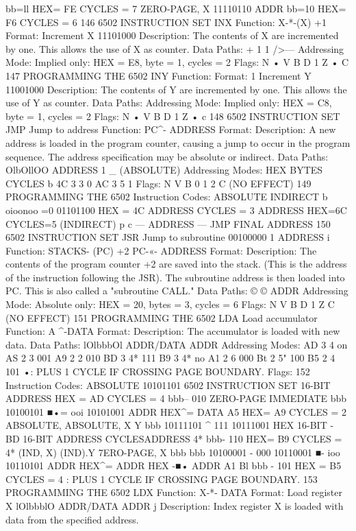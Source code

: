 \documentclass{book}
\begin{document}
bb=ll HEX= FE CYCLES = 7
ZERO-PAGE, X 11110110 ADDR
bb=10 HEX= F6 CYCLES = 6
146
6502 INSTRUCTION SET
INX
Function:
X-*-(X) +1
Format:
Increment X
11101000
Description:
The contents of X are incremented by one. This allows the use
of X as counter.
Data Paths:
+ 1
1
/>—
Addressing Mode:
Implied only:
HEX = E8, byte = 1, cycles = 2
Flags:
N
•
V B D 1 Z
•
C
147
PROGRAMMING THE 6502
INY
Function:
Format:
1
Increment Y
11001000
Description:
The contents of Y are incremented by one. This allows the use
of Y as counter.
Data Paths:
Addressing Mode:
Implied only:
HEX = C8, byte = 1, cycles = 2
Flags:
N
•
V B D 1 Z
•
c
148
6502 INSTRUCTION SET
JMP Jump to address
Function:
PC^- ADDRESS
Format:
Description:
A new address is loaded in the program counter, causing a jump
to occur in the program sequence. The address specification may
be absolute or indirect.
Data Paths:
OlbOllOO ADDRESS
1 _
(ABSOLUTE)
Addressing Modes:
HEX
BYTES
CYCLES
b
4C
3
3
0
AC
3
5
1
Flags:
N V B 0 1 2 C
(NO EFFECT)
149
PROGRAMMING THE 6502
Instruction Codes:
ABSOLUTE
INDIRECT
b
oioonoo
=0
01101100
HEX = 4C
ADDRESS
CYCLES = 3
ADDRESS
HEX=6C CYCLES=5
(INDIRECT)
p c
— ADDRESS —
JMP
FINAL ADDRESS
150
6502 INSTRUCTION SET
JSR Jump to subroutine
00100000
1
ADDRESS
i
Function:
STACKS- (PC) +2
PC-«- ADDRESS
Format:
Description:
The contents of the program counter +2 are saved into the
stack. (This is the address of the instruction following the JSR).
The subroutine address is then loaded into PC. This is also called
a "subroutine CALL."
Data Paths:
©
©
ADDR
Addressing Mode:
Absolute only:
HEX = 20, bytes = 3, cycles = 6
Flags:
N V B D 1 Z C
(NO EFFECT)
151
PROGRAMMING THE 6502
LDA Load accumulator
Function:
A ^-DATA
Format:
Description:
The accumulator is loaded with new data.
Data Paths:
lOlbbbOl ADDR/DATA ADDR
Addressing Modes:
AD
3
4
on
AS
2
3
001
A9
2
2
010
BD
3
4*
111
B9
3
4*
no
A1
2
6
000
Bt
2
5"
100
B5
2
4
101
•: PLUS 1 CYCLE IF CROSSING PAGE BOUNDARY.
Flags:
152
Instruction Codes:
ABSOLUTE 10101101
6502 INSTRUCTION SET
16-BIT ADDRESS
HEX = AD CYCLES = 4
bbb-- 010
ZERO-PAGE
IMMEDIATE
bbb
10100101
■•= ooi
10101001
ADDR
HEX^=
DATA
A5
HEX= A9 CYCLES = 2
ABSOLUTE,
ABSOLUTE,
X
Y
bbb
10111101
^ 111
10111001
HEX
16-BIT
- BD
16-BIT
ADDRESS
CYCLESADDRESS
4*
bbb- 110 HEX= B9 CYCLES = 4*
(IND, X)
(IND).Y
7ERO-PAGE, X
bbb
bbb
10100001
- 000
10110001
■- ioo
10110101
ADDR
HEX^=
ADDR
HEX -■•
ADDR
A1
Bl
bbb - 101 HEX = B5 CYCLES = 4
: PLUS 1 CYCLE IF CROSSING PAGE BOUNDARY.
153
PROGRAMMING THE 6502
LDX
Function:
X-*- DATA
Format:
Load register X
lOlbbblO ADDR/DATA ADDR j
Description:
Index register X is loaded with data from the specified address.
\end{document}

